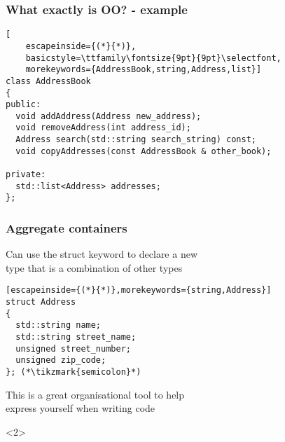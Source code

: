 \documentclass[14pt,a4paper,dvipsnames,usenames]{beamer}
\begin{document}
\begin{frame}[fragile]
  \frametitle{What exactly is OO? - example}

  \begin{lstlisting}[
    escapeinside={(*}{*)},
    basicstyle=\ttfamily\fontsize{9pt}{9pt}\selectfont,
    morekeywords={AddressBook,string,Address,list}]
class AddressBook
{
public:
  void addAddress(Address new_address);
  void removeAddress(int address_id);
  Address search(std::string search_string) const;
  void copyAddresses(const AddressBook & other_book);

private:
  std::list<Address> addresses;
};
  \end{lstlisting}

\end{frame}

\begin{frame}[fragile]
  \frametitle{Aggregate containers}

  Can use the {\color{FeebleWeek}struct} keyword to declare a new\\type that is a combination of other types

  \vspace{.3em}
  \begin{lstlisting}[escapeinside={(*}{*)},morekeywords={string,Address}]
struct Address
{
  std::string name;
  std::string street_name;
  unsigned street_number;
  unsigned zip_code;
}; (*\tikzmark{semicolon}*)
  \end{lstlisting}

  \vspace{.3em}
  This is a great organisational tool to help\\express yourself when writing code

  \begin{onlyenv}<2>
    \nointerlineskip
  \end{onlyenv}

\end{frame}
\end{document}
